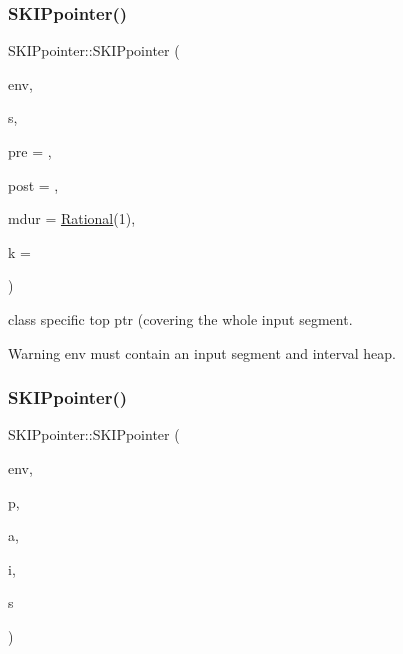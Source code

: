 \subsubsection{\texorpdfstring{SKIPpointer()}{SKIPpointer()}\hspace{0.1cm}{\footnotesize\ttfamily [4/7]}}
{\footnotesize\ttfamily S\+K\+I\+Ppointer\+::\+S\+K\+I\+Ppointer (\begin{DoxyParamCaption}\item[{\mbox{\hyperlink{classEnvironment}{Environment}} $\ast$}]{env,  }\item[{state\+\_\+t}]{s,  }\item[{\mbox{\hyperlink{group__general_ga092fe8b972dfa977c2a0886720a7731e}{pre\+\_\+t}}}]{pre = {},  }\item[{\mbox{\hyperlink{group__general_ga092fe8b972dfa977c2a0886720a7731e}{pre\+\_\+t}}}]{post = {},  }\item[{\mbox{\hyperlink{classRational}{Rational}}}]{mdur = {\ttfamily \mbox{\hyperlink{classRational}{Rational}}(1)},  }\item[{size\+\_\+t}]{k = {} }\end{DoxyParamCaption})}



class specific top ptr (covering the whole input segment. 

\begin{DoxyWarning}{Warning}
env must contain an input segment and interval heap. 
\end{DoxyWarning}
\mbox{\label{group__table_ga6cd275122aebf4288f5d60c36a141116}} 
\subsubsection{\texorpdfstring{SKIPpointer()}{SKIPpointer()}\hspace{0.1cm}{\footnotesize\ttfamily [5/7]}}
{\footnotesize\ttfamily S\+K\+I\+Ppointer\+::\+S\+K\+I\+Ppointer (\begin{DoxyParamCaption}\item[{\mbox{\hyperlink{classEnvironment}{Environment}} $\ast$}]{env,  }\item[{const \mbox{\hyperlink{classSKIPpointer}{S\+K\+I\+Ppointer}} \&}]{p,  }\item[{size\+\_\+t}]{a,  }\item[{size\+\_\+t}]{i,  }\item[{state\+\_\+t}]{s }\end{DoxyParamCaption})}



